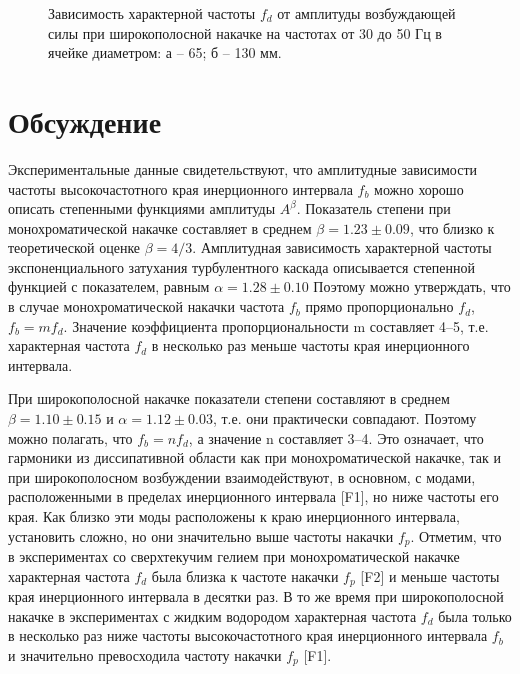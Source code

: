 \begin{figure}[ht]
  \begin{minipage}[ht]{0.49\linewidth}
  \end{minipage}
  \hfill
  \begin{minipage}[ht]{0.49\linewidth}
  \end{minipage}
  \caption{Зависимость характерной частоты $f_d$ от амплитуды возбуждающей силы при широкополосной накачке на частотах от 30 до 50 Гц в ячейке диаметром: а – 65; б – 130 мм.}
  \label{img:water_fd_wide}  
\end{figure}


\section{Обсуждение}%

Экспериментальные данные свидетельствуют, что амплитудные зависимости частоты высокочастотного края инерционного интервала $f_b$ можно хорошо описать степенными функциями амплитуды $A^\beta$. Показатель степени при монохроматической накачке составляет в среднем $\beta = 1.23 \pm 0.09$, что близко к теоретической оценке $\beta = 4/3$. Амплитудная зависимость характерной частоты экспоненциального затухания турбулентного каскада описывается степенной функцией с показателем, равным $\alpha = 1.28 \pm 0.10$ Поэтому можно утверждать, что в случае монохроматической накачки частота $f_b$ прямо пропорционально $f_d$, $f_b = m f_d$. Значение коэффициента пропорциональности m составляет 4–5, т.е. характерная частота $f_d$ в несколько раз меньше частоты края инерционного интервала.

При широкополосной накачке показатели степени составляют в среднем $\beta = 1.10 \pm 0.15$ и $\alpha = 1.12 \pm 0.03$, т.е. они практически совпадают. Поэтому можно полагать, что $f_b = n f_d$, а значение n составляет 3–4. Это означает, что гармоники из диссипативной области как при монохроматической накачке, так и при широкополосном возбуждении взаимодействуют, в основном, с модами, расположенными в пределах инерционного интервала [F1], но ниже частоты его края. Как близко эти моды расположены к краю инерционного интервала, установить сложно, но они значительно выше частоты накачки $f_p$.
Отметим, что в экспериментах со сверхтекучим гелием при монохроматической накачке характерная частота $f_d$ была близка к частоте накачки $f_p$ [F2] и меньше частоты края инерционного интервала в десятки раз. В то же время при широкополосной накачке в экспериментах с жидким водородом характерная частота $f_d$ была только в несколько раз ниже частоты высокочастотного края инерционного интервала $f_b$ и значительно превосходила частоту накачки $f_p$ [F1].

